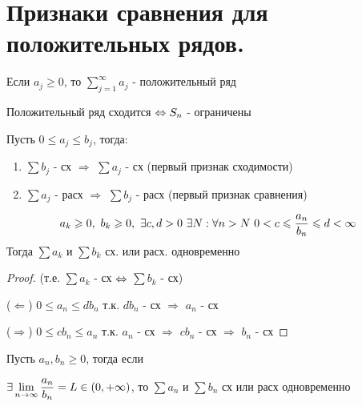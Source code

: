 \documentclass[matan]{subfiles}
\begin{document}
  \newpage
  \section{Признаки сравнения для положительных рядов.}

  \begin{definition}
      Если $a_j \geqslant 0$, то $\sum\limits_{j=1}^\infty a_j$ - положительный ряд
  \end{definition}

  \begin{theorem}
      Положительный ряд сходится $\Leftrightarrow S_n$ - ограничены
  \end{theorem}

  \begin{consequence}
      Пусть $0 \leqslant a_j \leqslant b_j$, тогда:
      \begin{enumerate}
          \item $\sum b_j$ - сх $\Rightarrow$ $\sum a_j$ - сх (первый признак сходимости)
          \item $\sum a_j$ - расх $\Rightarrow$ $\sum b_j$ - расх (первый признак сравнения)
      \end{enumerate}
  \end{consequence}

  \begin{Consequence}
      \[a_k \geqslant 0,\ b_k \geqslant 0,\ \exists c,d > 0\ \exists N: \forall n > N\ 0 < c \leqslant \frac{a_n}{b_n} \leqslant d < \infty\]
      Тогда $\sum a_k$ и $\sum b_k$ сх. или расх. одновременно
  \end{Consequence}

  \begin{proof}
      (т.е. $\sum a_k$ - сх $\Leftrightarrow$ $\sum b_k$ - сх)

      ($\Leftarrow$) $0 \leqslant a_n \leqslant d b_n$ т.к. $d b_n$ - сх $\Rightarrow$ $a_n$ - сх

      ($\Rightarrow$) $0 \leqslant c b_n \leqslant a_n$ т.к. $a_n$ - сх $\Rightarrow$ $c b_n$ - сх $\Rightarrow$ $b_n$ - сх
  \end{proof}

  \begin{consequence} 
      Пусть $a_n, b_n \geqslant 0$, тогда если

      $\exists \lim\limits_{n \rightarrow \infty} \dfrac{a_n}{b_n} = L \in (0, + \infty)$, то $\sum a_n$ и $\sum b_n$ сх или расх одновременно
  \end{consequence}
\end{document}

